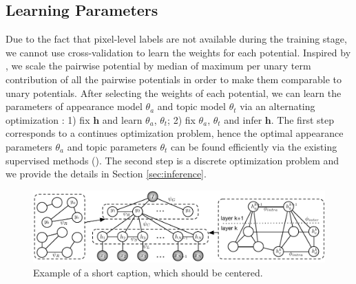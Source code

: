 \subsection{Learning Parameters}
Due to the fact that pixel-level labels are not available during the training stage, we cannot use cross-validation \cite{kohli2009robust} to learn the weights for each potential. Inspired by \cite{vezhnevets2011weakly}, we scale the pairwise potential by median of maximum per unary term contribution of all the pairwise potentials in order to make them comparable to unary potentials. After selecting the weights of each potential, we can learn the parameters of appearance model $\theta_a$ and topic model $\theta_t$ via an alternating optimization \cite{vezhnevets2011weakly}: 1) fix $\boldsymbol{h}$ and learn $\theta_a$, $\theta_t$; 2) fix $\theta_a$, $\theta_t$ and infer $\boldsymbol{h}$. The first step corresponds to a continues optimization problem, hence the optimal appearance parameters $\theta_a$ and topic parameters $\theta_t$ can be found efficiently via the existing supervised methods (\eg \cite{shotton2006textonboost}). The second step is a discrete optimization problem and we provide the details in Section \ref{sec:inference}.

\begin{figure}[!htb]
    \begin{center}
        \includegraphics[width=0.95\linewidth]{graphmodel.pdf}
    \end{center}
    \caption{Example of a short caption, which should be centered.}
    \label{fig:graphmodel}
\end{figure}

